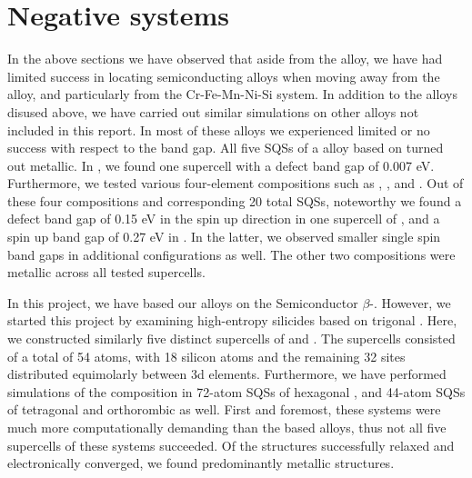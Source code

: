 \newpage
\section{Negative systems}

In the above sections we have observed that aside from the  alloy, we have had limited success in locating semiconducting alloys when moving away from the  alloy, and particularly from the Cr-Fe-Mn-Ni-Si system. In addition to the alloys disused above, we have carried out similar simulations on other alloys not included in this report. In most of these alloys we experienced limited or no success with respect to the band gap. All five SQSs of a  alloy based on  turned out metallic. In , we found one supercell with a defect band gap of 0.007 eV. Furthermore, we tested various four-element compositions such as , ,  and . Out of these four compositions and corresponding 20 total SQSs, noteworthy we found a defect band gap of 0.15 eV in the spin up direction in one supercell of , and a spin up band gap of 0.27 eV in . In the latter, we observed smaller single spin band gaps in additional configurations as well. The other two compositions were metallic across all tested supercells.    

In this project, we have based our alloys on the Semiconductor $\beta$-. However, we started this project by examining high-entropy silicides based on trigonal . Here, we constructed similarly five distinct supercells of  and . The supercells consisted of a total of 54 atoms, with 18 silicon atoms and the remaining 32 sites distributed equimolarly between 3d elements. Furthermore, we have performed simulations of the  composition in 72-atom SQSs of hexagonal , and 44-atom SQSs of tetragonal and orthorombic  as well. First and foremost, these systems were much more computationally demanding than the  based alloys, thus not all five supercells of these systems succeeded. Of the structures successfully relaxed and electronically converged, we found predominantly metallic structures.

  
